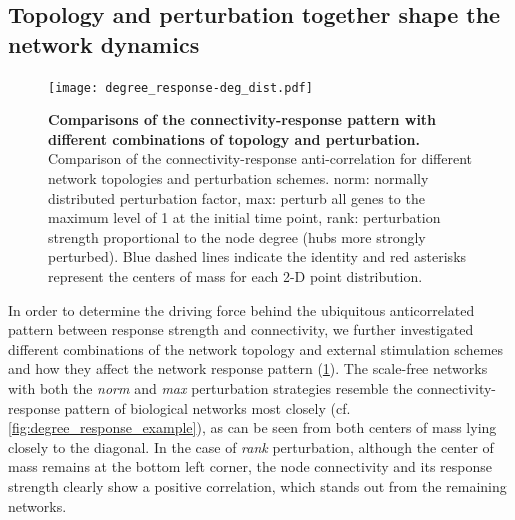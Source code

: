 \subsection{Topology and perturbation together shape the network dynamics}

\begin{figure}[!ht]
\begin{center}
\texttt{[image: degree\_response-deg\_dist.pdf]}
\end{center}
\caption[Combination of topology and perturbation]{
{\bf Comparisons of the connectivity-response pattern with
different combinations of topology and perturbation.} 
Comparison of the connectivity-response
anti-correlation for different network topologies and
perturbation schemes. norm: normally distributed perturbation
factor, max: perturb all genes to the maximum level of 1 at
the initial time point, rank: perturbation strength
proportional to the node degree (hubs more strongly
perturbed).
Blue dashed lines indicate the identity and red asterisks 
represent the centers of mass for each 2-D point distribution.
}
\label{fig:degree_response_deg_dist}
\end{figure}

In order to determine the driving force behind the ubiquitous
anticorrelated pattern between response strength and connectivity, we
further investigated different combinations of the network topology and
external stimulation schemes and how they affect the network response
pattern (\ref{fig:degree_response_deg_dist}). 
The scale-free networks with both the \emph{norm} and \emph{max}
perturbation strategies resemble the connectivity-response pattern of 
biological networks most closely (cf. \ref{fig:degree_response_example}), 
as can be seen from both centers of mass
lying closely to the diagonal. In the case of \emph{rank} perturbation,
although the center of mass remains at the bottom left corner, the node
connectivity and its response strength clearly show a positive correlation,
which stands out from the remaining networks. 

